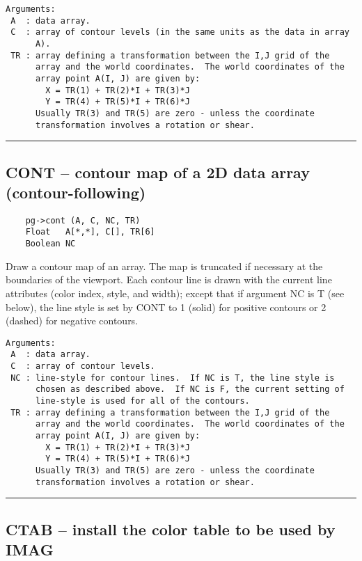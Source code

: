 \begin{verbatim}
Arguments:
 A  : data array.
 C  : array of contour levels (in the same units as the data in array
      A). 
 TR : array defining a transformation between the I,J grid of the
      array and the world coordinates.  The world coordinates of the
      array point A(I, J) are given by:
        X = TR(1) + TR(2)*I + TR(3)*J
        Y = TR(4) + TR(5)*I + TR(6)*J
      Usually TR(3) and TR(5) are zero - unless the coordinate
      transformation involves a rotation or shear.
\end{verbatim}

\hrule

\subsection*{CONT -- contour map of a 2D data array (contour-following) }

\begin{verbatim}
    pg->cont (A, C, NC, TR)
    Float   A[*,*], C[], TR[6]
    Boolean NC
\end{verbatim}

Draw a contour map of an array.  The map is truncated if necessary at
the boundaries of the viewport.  Each contour line is drawn with the
current line attributes (color index, style, and width); except that
if argument NC is T (see below), the line style is set by CONT to 1
(solid) for positive contours or 2 (dashed) for negative contours.

\begin{verbatim}
Arguments:
 A  : data array.
 C  : array of contour levels.
 NC : line-style for contour lines.  If NC is T, the line style is
      chosen as described above.  If NC is F, the current setting of
      line-style is used for all of the contours.
 TR : array defining a transformation between the I,J grid of the
      array and the world coordinates.  The world coordinates of the
      array point A(I, J) are given by:
        X = TR(1) + TR(2)*I + TR(3)*J
        Y = TR(4) + TR(5)*I + TR(6)*J
      Usually TR(3) and TR(5) are zero - unless the coordinate
      transformation involves a rotation or shear.
\end{verbatim}

\hrule

\subsection*{CTAB -- install the color table to be used by IMAG }

